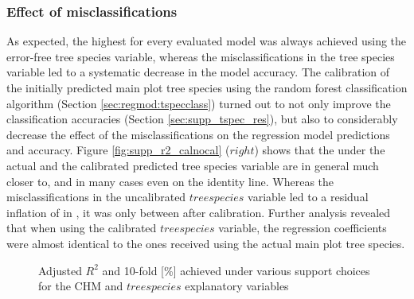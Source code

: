 \subsubsection*{Effect of misclassifications}

 As expected, the highest \adjrsq{} for every evaluated model was always achieved using the error-free tree species variable, whereas the misclassifications in the tree species variable led to a systematic decrease in the model accuracy. The calibration of the initially predicted main plot tree species using the random forest classification algorithm (Section \ref{sec:regmod:tspecclass}) turned out to not only improve the classification accuracies (Section \ref{sec:supp_tspec_res}), but also to considerably decrease the effect of the misclassifications on the regression model predictions and accuracy. Figure \ref{fig:supp_r2_calnocal} ($right$) shows that the \adjrsq{} under the actual and the calibrated predicted tree species variable are in general much closer to, and in many cases even on the identity line.  Whereas the misclassifications in the uncalibrated $treespecies$ variable led to a residual inflation of  in \adjrsq{}, it was only between  after calibration. Further analysis revealed that when using the calibrated $treespecies$ variable, the regression coefficients were almost identical to the ones received using the actual main plot tree species.

\begin{figure}[h]
	\centering
	\caption{Adjusted $R^2$ and 10-fold \rmsecv{}[\%] achieved under various support choices for the CHM and $tree species$ explanatory variables}
	\label{fig:supp_perf_res}
\end{figure}


